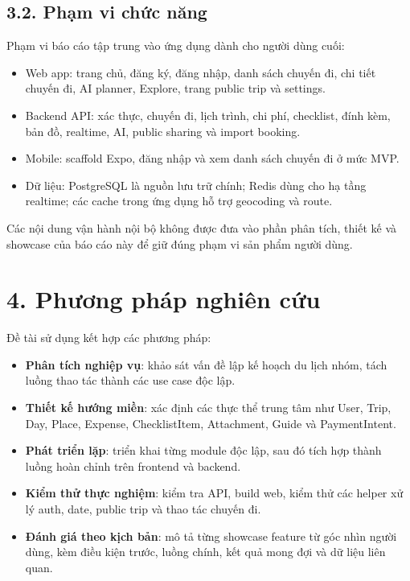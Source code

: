\documentclass[a4paper]{report}
\begin{document}
\subsection*{3.2. Phạm vi chức năng}

Phạm vi báo cáo tập trung vào ứng dụng dành cho người dùng cuối:

\begin{itemize}
  \item Web app: trang chủ, đăng ký, đăng nhập, danh sách chuyến đi, chi tiết chuyến đi, AI planner, Explore, trang public trip và settings.
  \item Backend API: xác thực, chuyến đi, lịch trình, chi phí, checklist, đính kèm, bản đồ, realtime, AI, public sharing và import booking.
  \item Mobile: scaffold Expo, đăng nhập và xem danh sách chuyến đi ở mức MVP.
  \item Dữ liệu: PostgreSQL là nguồn lưu trữ chính; Redis dùng cho hạ tầng realtime; các cache trong ứng dụng hỗ trợ geocoding và route.
\end{itemize}

Các nội dung vận hành nội bộ không được đưa vào phần phân tích, thiết kế và showcase của báo cáo này để giữ đúng phạm vi sản phẩm người dùng.

\section*{4. Phương pháp nghiên cứu}

Đề tài sử dụng kết hợp các phương pháp:

\begin{itemize}
  \item \textbf{Phân tích nghiệp vụ}: khảo sát vấn đề lập kế hoạch du lịch nhóm, tách luồng thao tác thành các use case độc lập.
  \item \textbf{Thiết kế hướng miền}: xác định các thực thể trung tâm như User, Trip, Day, Place, Expense, ChecklistItem, Attachment, Guide và PaymentIntent.
  \item \textbf{Phát triển lặp}: triển khai từng module độc lập, sau đó tích hợp thành luồng hoàn chỉnh trên frontend và backend.
  \item \textbf{Kiểm thử thực nghiệm}: kiểm tra API, build web, kiểm thử các helper xử lý auth, date, public trip và thao tác chuyến đi.
  \item \textbf{Đánh giá theo kịch bản}: mô tả từng showcase feature từ góc nhìn người dùng, kèm điều kiện trước, luồng chính, kết quả mong đợi và dữ liệu liên quan.
\end{itemize}
\end{document}
